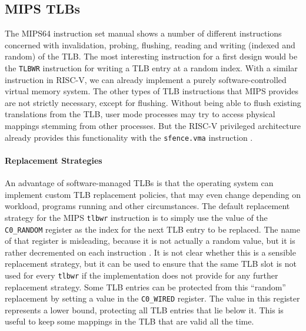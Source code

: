 \subsection{MIPS TLBs}               %


The MIPS64 instruction set manual \cite{MIPSArchitectureProgrammers2016}
shows a number of different instructions concerned with invalidation, probing, flushing, reading
and writing (indexed and random) of the TLB.
The most interesting instruction for a first design would be the \texttt{TLBWR} instruction for writing a TLB
entry at a random index. With a similar instruction in RISC-V, we can already implement a purely
software-controlled virtual memory system.
The other types of TLB instructions that MIPS provides are not strictly necessary,
except for flushing. Without being able to flush existing translations from the TLB,
user mode processes may try to access physical mappings stemming from other processes. But the RISC-V privileged architecture already provides this functionality
with the \texttt{sfence.vma} instruction \cite{riscvreader}.


\paragraph{Replacement Strategies} An advantage of software-managed TLBs is that the operating system can implement custom
TLB replacement policies, that may even change depending on workload, programs running
and other circumstances.
The default replacement strategy for the MIPS \texttt{tlbwr} instruction is to simply
use the value of the \texttt{C0\_RANDOM} register as the index for the next TLB entry
to be replaced. The name of that register is misleading, because it is not actually a
random value, but it is rather decremented on each instruction \cite{heiserAnatomyHighPerformanceMicrokernel}.
It is not clear whether this is a sensible replacement strategy,
but it can be used to ensure that the same TLB slot is not used for every \texttt{tlbwr} if the implementation
does not provide for any further replacement strategy.
Some TLB entries can be protected from this ``random'' replacement by setting a value in the \texttt{C0\_WIRED}
register. The value in this register represents a lower bound, protecting all TLB entries that lie below it.
This is useful to keep some mappings in the TLB that are valid all the time.

